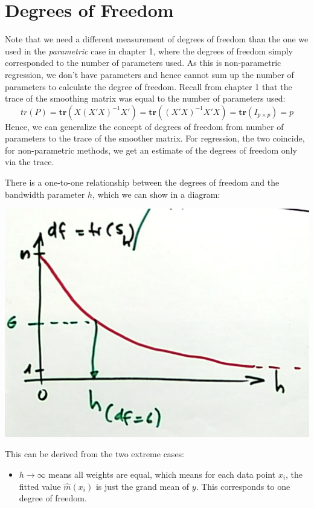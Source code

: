 \documentclass[]{book}
\providecommand{\tightlist}{%
  \setlength{\itemsep}{0pt}\setlength{\parskip}{0pt}}
\begin{document}
\section{Degrees of Freedom}\label{degrees-of-freedom-1}

Note that we need a different measurement of degrees of freedom than the
one we used in the \emph{parametric} case in chapter 1, where the
degrees of freedom simply corresponded to the number of parameters used.
As this is non-parametric regression, we don't have parameters and hence
cannot sum up the number of parameters to calculate the degree of
freedom. Recall from chapter 1 that the trace of the smoothing matrix
was equal to the number of parameters used:
\[tr(P) = \textbf{tr}(X(X'X)^{-1}X') = \textbf{tr}((X'X)^{-1}X'X) = \textbf{tr}(I_{p\times p}) = p\]
Hence, we can generalize the concept of degrees of freedom from number
of parameters to the trace of the smoother matrix. For regression, the
two coincide, for non-parametric methods, we get an estimate of the
degrees of freedom only via the trace.

There is a one-to-one relationship between the degrees of freedom and
the bandwidth parameter \(h\), which we can show in a diagram:

\includegraphics[width=650px]{figures/relationship-h-df}

This can be derived from the two extreme cases:

\begin{itemize}
\tightlist
\item
  \(h \rightarrow \infty\) means all weights are equal, which means for
  each data point \(x_i\), the fitted value \(\hat{m}(x_i)\) is just the
  grand mean of \(y\). This corresponds to one degree of freedom.
\end{itemize}
\end{document}
